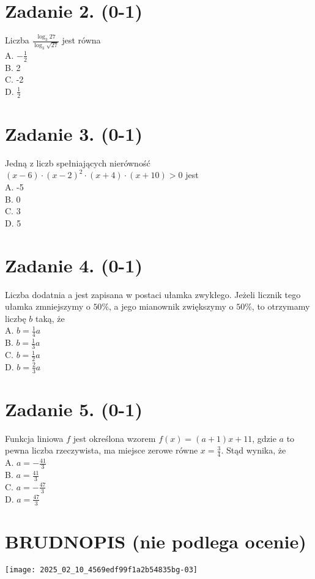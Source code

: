 \documentclass[10pt]{article}
\begin{document}
\section*{Zadanie 2. (0-1)}
Liczba \(\frac{\log _{3} 27}{\log _{3} \sqrt{27}}\) jest równa\\
A. \(-\frac{1}{2}\)\\
B. 2\\
C. -2\\
D. \(\frac{1}{2}\)

\section*{Zadanie 3. (0-1)}
Jedną z liczb spełniających nierówność \((x-6) \cdot(x-2)^{2} \cdot(x+4) \cdot(x+10)>0\) jest\\
A. -5\\
B. 0\\
C. 3\\
D. 5

\section*{Zadanie 4. (0-1)}
Liczba dodatnia a jest zapisana w postaci ułamka zwykłego. Jeżeli licznik tego ułamka zmniejszymy o \(50 \%\), a jego mianownik zwiększymy o \(50 \%\), to otrzymamy liczbę \(b\) taką, że\\
A. \(b=\frac{1}{4} a\)\\
B. \(b=\frac{1}{3} a\)\\
C. \(b=\frac{1}{2} a\)\\
D. \(b=\frac{2}{3} a\)

\section*{Zadanie 5. (0-1)}
Funkcja liniowa \(f\) jest określona wzorem \(f(x)=(a+1) x+11\), gdzie \(a\) to pewna liczba rzeczywista, ma miejsce zerowe równe \(x=\frac{3}{4}\). Stąd wynika, że\\
A. \(a=-\frac{41}{3}\)\\
B. \(a=\frac{41}{3}\)\\
C. \(a=-\frac{47}{3}\)\\
D. \(a=\frac{47}{3}\)

\section*{BRUDNOPIS (nie podlega ocenie)}
\begin{center}
\texttt{[image: 2025\_02\_10\_4569edf99f1a2b54835bg-03]}
\end{center}
\end{document}

